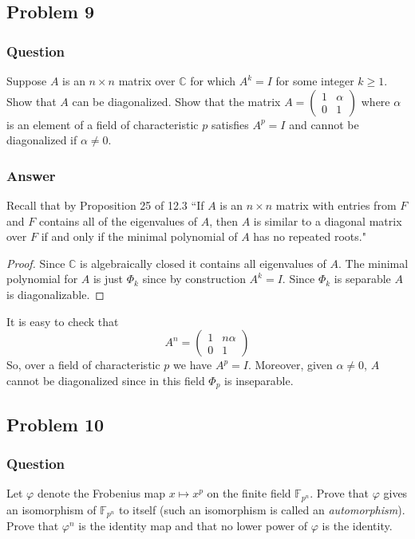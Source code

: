 \documentclass[10pt]{article}
\begin{document}
\subsection{Problem 9}
\subsubsection{Question}
Suppose $A$ is an $n \times n$ matrix over $\mathbb{C}$ for which $A^k=I$ for some integer $k \geq 1$. Show that $A$ can be diagonalized. Show that the matrix $A = \left( \begin{array}{cc} 1 & \alpha \\ 0 & 1 \end{array} \right)$ where $\alpha$ is an element of a field of characteristic $p$ satisfies $A^p=I$ and cannot be diagonalized if $\alpha \neq 0$.
\subsubsection{Answer}
Recall that by Proposition 25 of 12.3 
``If $A$ is an $n \times n$ matrix with entries from $F$ and $F$ contains all of the eigenvalues of $A$, then $A$ is similar to a diagonal matrix over $F$ if and only if the minimal polynomial of $A$ has no repeated roots."
\begin{proof}
Since $\mathbb{C}$ is algebraically closed it contains all eigenvalues of $A$. The minimal polynomial for $A$ is just $\Phi_k$ since by construction $A^k = I$. Since $\Phi_k$ is separable $A$ is diagonalizable.
\end{proof}
It is easy to check that 
\[A ^n = \left( \begin{array}{cc} 1 & n \alpha \\ 0 & 1 \end{array} \right) \]
So, over a field of characteristic $p$ we have $A^p=I$. Moreover, given $\alpha \neq 0 $, $A$ cannot be diagonalized since in this field $\Phi_p$ is inseparable.

\subsection{Problem 10}
\subsubsection{Question}
Let $\varphi$ denote the Frobenius map $x \mapsto x^p$ on the finite field $\mathbb{F}_{p^n}$. Prove that $\varphi$ gives an isomorphism of $\mathbb{F}_{p^n}$ to itself (such an isomorphism is called an \emph{automorphism}). Prove that $\varphi^n$ is the identity map and that no lower power of $\varphi$ is the identity.
\end{document}
